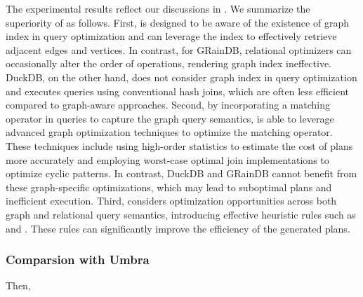 The experimental results reflect our discussions in . We summarize the superiority of \name as follows.
First, \name is designed to be aware of the existence of graph index in query optimization and can leverage the index to effectively retrieve adjacent edges and vertices. In contrast, for GRainDB, relational optimizers can occasionally alter the order of \EVjoin operations, rendering graph index ineffective. DuckDB, on the other hand, does not consider graph index in query optimization and executes queries using conventional hash joins, which are often less efficient compared to graph-aware approaches.
Second, by incorporating a matching operator in \spjm queries to capture the graph query semantics, \name is able to leverage advanced graph optimization techniques to optimize the matching operator. These techniques include using high-order statistics to estimate the cost of plans more accurately and employing worst-case optimal join implementations to optimize cyclic patterns. In contrast, DuckDB and GRainDB cannot benefit from these graph-specific optimizations, which may lead to suboptimal plans and inefficient execution.
Third, \name considers optimization opportunities across both graph and relational query semantics, introducing effective heuristic rules such as \filterrule and \joinfuserule. These rules can significantly improve the efficiency of the generated plans.


\subsubsection{Comparsion with Umbra}
Then, 

